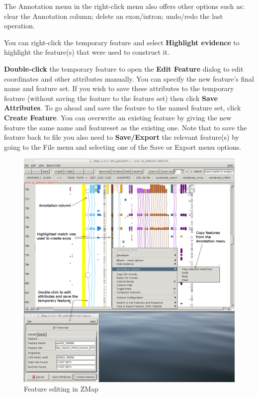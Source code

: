 \documentclass[letterpaper]{article}
\begin{document}
The Annotation menu in the right-click menu also offers other options such as: clear the Annotation column; delete an exon/intron; undo/redo the last operation.

You can right-click the temporary feature and select \textbf{Highlight evidence} to highlight the feature(s) that were used to construct it.

\textbf{Double-click} the temporary feature to open the \textbf{Edit Feature} dialog to edit coordinates and other attributes manually. You can specify the new feature's final name and feature set. If you wish to save these attributes to the temporary feature (without saving the feature to the feature set) then click \textbf{Save Attributes}. To go ahead and save the feature to the named feature set, click \textbf{Create Feature}. You can overwrite an existing feature by giving the new feature the same name and featureset as the existing one. Note that to save the feature back to file you also need to \textbf{Save/Export} the relevant feature(s) by going to the File menu and selecting one of the Save or Export menu options.

\begin{figure}
\centering
\color[rgb]{0.30980393,0.5058824,0.7411765}
\includegraphics[width=15.231cm]{img_editing_zmap.png}
\caption{Feature editing in ZMap}
\label{img_editing_zmap}
\end{figure}
\end{document}

